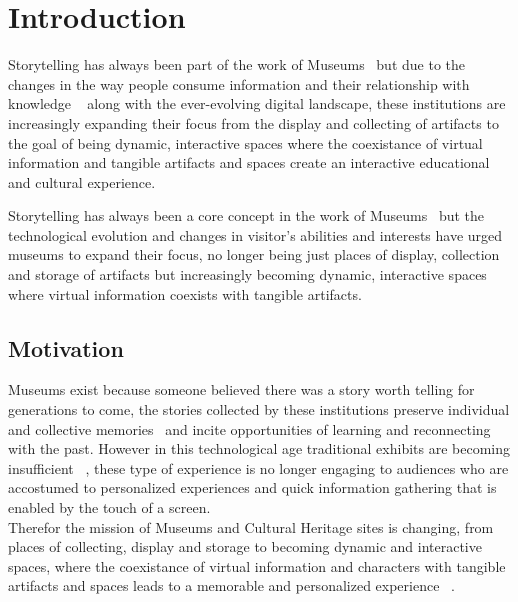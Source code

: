 
%

\chapter{Introduction}
\label{cha:introduction}


\epigraphfontsize{\small\itshape}
\setlength\epigraphwidth{12.5cm}
\setlength\epigraphrule{0pt}

Storytelling has always been part of the work of Museums~\cite{bedford_storytelling_2001} but due to the changes in 
the way people consume information and their relationship with knowledge ~\cite{wyman_digital_2011} along with the ever-evolving digital landscape,
these institutions are increasingly expanding their focus from the display and collecting of artifacts to the goal of being dynamic, interactive spaces
where the coexistance of virtual information and tangible artifacts and spaces create an interactive educational and cultural experience.

Storytelling has always been a core concept in the work of Museums~\cite{bedford_storytelling_2001} but the technological evolution and changes in visitor's abilities and interests
have urged museums to expand their focus, no longer being just places of display, collection and storage of artifacts but increasingly becoming
dynamic, interactive spaces where virtual information coexists with tangible artifacts.



\section{Motivation}
\label{sec:motivation}

Museums exist because someone believed there was a story worth telling for generations to come, the stories collected by these institutions
preserve individual and collective memories~\cite{bedford_storytelling_2001} and incite opportunities of learning and reconnecting with the past.
However in this technological age traditional exhibits are becoming insufficient ~\cite[pp. 326]{seale_education_2023}, these type of experience is no longer engaging to audiences who 
are accostumed to personalized experiences and quick information gathering that is enabled by the touch of a screen.\\
Therefor the mission of Museums and Cultural Heritage sites is changing, from places of collecting, display and storage to becoming
dynamic and interactive spaces, where the coexistance of virtual information and characters with tangible artifacts and spaces leads to a memorable and personalized experience ~\cite[pp. 3978]{dal_falco_museum_2017}.

